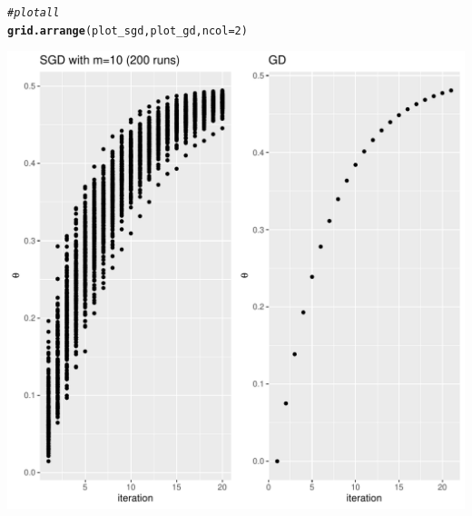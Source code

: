 \documentclass[a4paper]{article}
\makeatletter
\newcommand{\hlnum}[1]{\textcolor[rgb]{0.686,0.059,0.569}{#1}}%
\newcommand{\hlcom}[1]{\textcolor[rgb]{0.678,0.584,0.686}{\textit{#1}}}%
\newcommand{\hlstd}[1]{\textcolor[rgb]{0.345,0.345,0.345}{#1}}%
\newcommand{\hlkwc}[1]{\textcolor[rgb]{0.333,0.667,0.333}{#1}}%
\newcommand{\hlkwd}[1]{\textcolor[rgb]{0.737,0.353,0.396}{\textbf{#1}}}%
\newenvironment{kframe}{%
 \def\at@end@of@kframe{}%
 \ifinner\ifhmode%
  \def\at@end@of@kframe{\end{minipage}}%
  \begin{minipage}{\columnwidth}%
 \fi\fi%
 \def\FrameCommand##1{\hskip\@totalleftmargin \hskip-\fboxsep
 \colorbox{shadecolor}{##1}\hskip-\fboxsep
     \hskip-\linewidth \hskip-\@totalleftmargin \hskip\columnwidth}%
 \MakeFramed {\advance\hsize-\width
   \@totalleftmargin\z@ \linewidth\hsize
   \@setminipage}}%
 {\par\unskip\endMakeFramed%
 \at@end@of@kframe}
\newenvironment{knitrout}{}{} %
\makeatother
\begin{document}
{\begin{enumerate}
\begin{knitrout}
\begin{kframe}
\begin{alltt}
\hlcom{# plot all}
\hlkwd{grid.arrange}\hlstd{(plot_sgd, plot_gd,} \hlkwc{ncol}\hlstd{=}\hlnum{2}\hlstd{)}
\end{alltt}
\end{kframe}
\includegraphics[width=0.5\linewidth]{figure/mv-plot_compare-1} 
\end{knitrout}
\end{enumerate}

}
\end{document}
